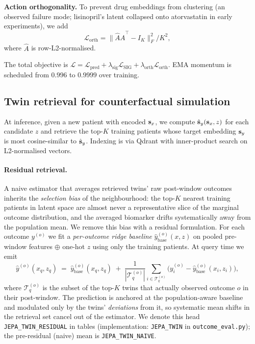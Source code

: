 \textbf{Action orthogonality.} To prevent drug embeddings from
clustering (an observed failure mode; lisinopril's latent collapsed
onto atorvastatin in early experiments), we add
\[
  \mathcal{L}_{\text{orth}} = \bigl\| \hat{A}\hat{A}^\top - I_K \bigr\|_F^2 / K^2,
\]
where $\hat{A}$ is row-L2-normalised.

The total objective is
$
  \mathcal{L} = \mathcal{L}_{\text{pred}}
  + \lambda_{\text{sig}} \mathcal{L}_{\text{SIG}}
  + \lambda_{\text{orth}} \mathcal{L}_{\text{orth}}.
$
EMA momentum is scheduled from $0.996$ to $0.9999$ over training.

\subsection{Twin retrieval for counterfactual simulation}
\label{sec:twins}

At inference, given a new patient with encoded $\mathbf{s}_x$, we compute
$\hat{\mathbf{s}}_y(\mathbf{s}_x, z)$ for each candidate $z$ and retrieve the top-$K$ training
patients whose target embedding $\mathbf{s}_y$ is most cosine-similar to
$\hat{\mathbf{s}}_y$. Indexing is via Qdrant with inner-product search on
L2-normalised vectors.

\paragraph{Residual retrieval.} A naive estimator that averages retrieved
twins' raw post-window outcomes inherits the \emph{selection bias} of the
neighbourhood: the top-$K$ nearest training patients in latent space are
almost never a representative slice of the marginal outcome distribution,
and the averaged biomarker drifts systematically away from the population
mean. We remove this bias with a residual formulation. For each outcome
$y^{(o)}$ we fit a \emph{per-outcome ridge baseline}
$\hat y^{(o)}_{\text{base}}(x, z)$ on pooled pre-window features
$\oplus$ one-hot $z$ using only the training patients. At query time we
emit
\[
\hat y^{(o)}(x_q, z_q) \;=\;
\hat y^{(o)}_{\text{base}}(x_q, z_q)
\;+\; \frac{1}{|\mathcal{T}_q^{(o)}|}
\sum_{i \in \mathcal{T}_q^{(o)}}
\bigl(y^{(o)}_i - \hat y^{(o)}_{\text{base}}(x_i, z_i)\bigr),
\]
where $\mathcal{T}_q^{(o)}$ is the subset of the top-$K$ twins that
actually observed outcome $o$ in their post-window. The prediction is
anchored at the population-aware baseline and modulated only by the
twins' \emph{deviations} from it, so systematic mean shifts in the
retrieval set cancel out of the estimator. We denote this head
\texttt{JEPA\_TWIN\_RESIDUAL} in tables (implementation:
\texttt{JEPA\_TWIN} in \texttt{outcome\_eval.py}); the pre-residual
(naive) mean is \texttt{JEPA\_TWIN\_NAIVE}.

